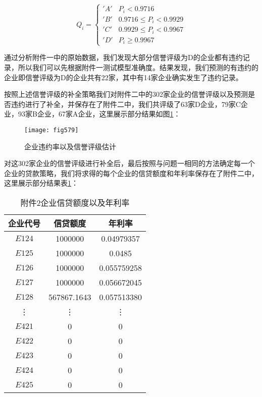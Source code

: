 \documentclass{cumcmthesis}
\begin{document}
\begin{equation}
    Q_i = 
    \begin{cases}
        'A' & P_i < 0.9716 \\
        'B' & 0.9716 \leq P_i < 0.9929 \\
        'C' & 0.9929 \leq P_i < 0.9967 \\
        'D' & P_i \geq 0.9967
    \end{cases}
    \label{pingji123}
\end{equation}

通过分析附件一中的原始数据，我们发现大部分信誉评级为D的企业都有违约记录，所以我们可以先根据附件一测试模型准确度。结果发现，我们预测的有违约的企业即信誉评级为D的企业共有22家，其中有14家企业确实发生了违约记录。

按照上述信誉评级的补全策略我们对附件二中的302家企业的信誉评级以及预测是否违约进行了补全，并保存在了附件二中，我们共评级了63家D企业，79家C企业，93家B企业，67家A企业，这里展示部分结果如图\ref{figpingji}：


\begin{figure}[H]
    \centering
    \texttt{[image: fig579]}
    \caption{企业违约率以及信誉评级估计}
    \label{figpingji}
\end{figure}

对这302家企业的信誉评级进行补全后，最后按照与问题一相同的方法确定每一个企业的贷款策略，我们将求得的每个企业的信贷额度和年利率保存在了附件二中，
这里展示部分结果表\ref{table23445}：

\begin{table}[H]
    \begin{center}
    \begin{tabular}{|c|c|c|}
        \hline
    企业代号 & 信贷额度 & 年利率\\
    \hline
    $E124$ & 1000000    & 0.04979357\\
    $E125$ & 1000000 & 0.0485\\
    $E126$ & 1000000 & 0.055759258\\
    $E127$ & 1000000 & 0.056672045    \\
    $E128$ & 567867.1643 & 0.057513380\\
    \vdots & \vdots & \vdots\\
    $E421$ & 0 & 0\\
    $E422$ & 0 & 0\\
    $E423$ & 0 & 0\\
    $E424$ & 0 & 0\\
    $E425$ & 0 & 0\\
    \hline
    \end{tabular}
    \end{center}
    \caption{附件2企业信贷额度以及年利率}
    \label{table23445}
    \end{table}
\end{document}
